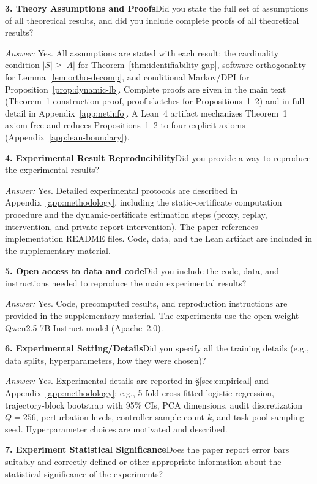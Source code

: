 \documentclass{article}
\begin{document}
\noindent\textbf{3. Theory Assumptions and Proofs}\quad Did you state the full set of assumptions of all theoretical results, and did you include complete proofs of all theoretical results?

\emph{Answer:} Yes. All assumptions are stated with each result: the cardinality condition $|S| \geq |A|$ for Theorem~\ref{thm:identifiability-gap}, software orthogonality for Lemma~\ref{lem:ortho-decomp}, and conditional Markov/DPI for Proposition~\ref{prop:dynamic-lb}. Complete proofs are given in the main text (Theorem~1 construction proof, proof sketches for Propositions~1--2) and in full detail in Appendix~\ref{app:netinfo}. A Lean~4 artifact mechanizes Theorem~1 axiom-free and reduces Propositions~1--2 to four explicit axioms (Appendix~\ref{app:lean-boundary}).

\noindent\textbf{4. Experimental Result Reproducibility}\quad Did you provide a way to reproduce the experimental results?

\emph{Answer:} Yes. Detailed experimental protocols are described in Appendix~\ref{app:methodology}, including the static-certificate computation procedure and the dynamic-certificate estimation steps (proxy, replay, intervention, and private-report intervention). The paper references implementation README files. Code, data, and the Lean artifact are included in the supplementary material.

\noindent\textbf{5. Open access to data and code}\quad Did you include the code, data, and instructions needed to reproduce the main experimental results?

\emph{Answer:} Yes. Code, precomputed results, and reproduction instructions are provided in the supplementary material. The experiments use the open-weight Qwen2.5-7B-Instruct model (Apache~2.0).

\noindent\textbf{6. Experimental Setting/Details}\quad Did you specify all the training details (e.g., data splits, hyperparameters, how they were chosen)?

\emph{Answer:} Yes. Experimental details are reported in \S\ref{sec:empirical} and Appendix~\ref{app:methodology}: e.g., 5-fold cross-fitted logistic regression, trajectory-block bootstrap with 95\% CIs, PCA dimensions, audit discretization $Q=256$, perturbation levels, controller sample count $k$, and task-pool sampling seed. Hyperparameter choices are motivated and described.

\noindent\textbf{7. Experiment Statistical Significance}\quad Does the paper report error bars suitably and correctly defined or other appropriate information about the statistical significance of the experiments?
\end{document}
